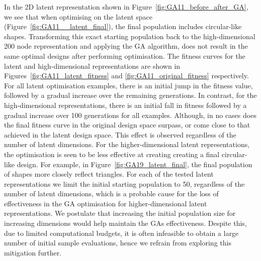 \documentclass{article}
\begin{document}
In the 2D latent representation shown in Figure~\ref{fig:GA11_before_after_GA}, we see that when optimising on the latent space (Figure~\ref{fig:GA11__latent_final}), the final population includes circular-like shapes. Transforming this exact starting population back to the high-dimensional 200 node representation and applying the GA algorithm, does not result in the same optimal designs after performing optimisation. The fitness curves for the latent and high-dimensional representations are shown in Figures~\ref{fig:GA11_latent_fitness} and \ref{fig:GA11_original_fitness} respectively. For all latent optimisation examples, there is an initial jump in the fitness value, followed by a gradual increase over the remaining generations. In contrast, for the high-dimensional representations, there is an initial fall in fitness followed by a gradual increase over 100 generations for all examples. Although, in no cases does the final fitness curve in the original design space surpass, or come close to that achieved in the latent design space. This effect is observed regardless of the number of latent dimensions. For the higher-dimensional latent representations, the optimisation is seen to be less effective at creating creating a final circular-like design. For example, in Figure~\ref{fig:GA19_latent_final}, the final population of shapes more closely reflect triangles. For each of the tested latent representations we limit the initial starting population to 50,  regardless of the number of latent dimensions, which is a probable cause for the loss of effectiveness in the GA optimisation for higher-dimensional latent representations. We postulate that increasing the initial population size for increasing dimensions would help maintain the GAs effectiveness. Despite this, due to limited computational budgets, it is often infeasible to obtain a large number of initial sample evaluations, hence we refrain from exploring this mitigation further.
\end{document}
